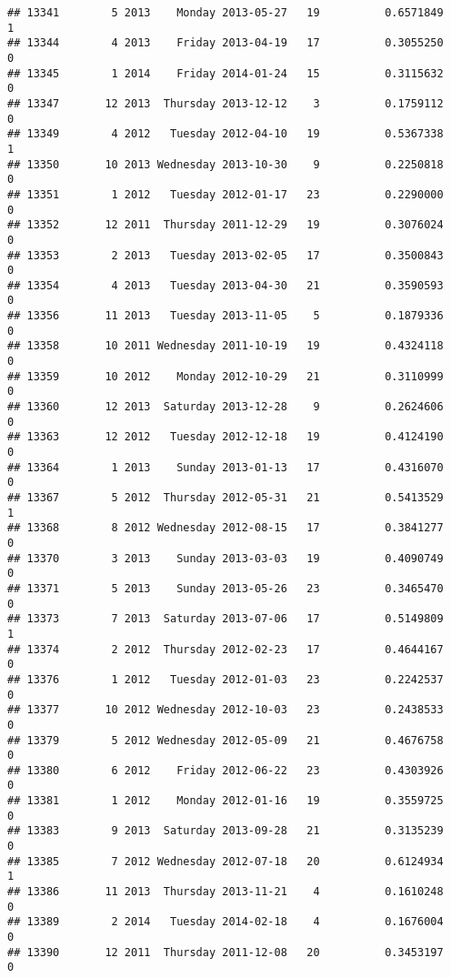 \documentclass[
]{article}
\begin{document}
\begin{verbatim}
## 13341        5 2013    Monday 2013-05-27   19          0.6571849             1
## 13344        4 2013    Friday 2013-04-19   17          0.3055250             0
## 13345        1 2014    Friday 2014-01-24   15          0.3115632             0
## 13347       12 2013  Thursday 2013-12-12    3          0.1759112             0
## 13349        4 2012   Tuesday 2012-04-10   19          0.5367338             1
## 13350       10 2013 Wednesday 2013-10-30    9          0.2250818             0
## 13351        1 2012   Tuesday 2012-01-17   23          0.2290000             0
## 13352       12 2011  Thursday 2011-12-29   19          0.3076024             0
## 13353        2 2013   Tuesday 2013-02-05   17          0.3500843             0
## 13354        4 2013   Tuesday 2013-04-30   21          0.3590593             0
## 13356       11 2013   Tuesday 2013-11-05    5          0.1879336             0
## 13358       10 2011 Wednesday 2011-10-19   19          0.4324118             0
## 13359       10 2012    Monday 2012-10-29   21          0.3110999             0
## 13360       12 2013  Saturday 2013-12-28    9          0.2624606             0
## 13363       12 2012   Tuesday 2012-12-18   19          0.4124190             0
## 13364        1 2013    Sunday 2013-01-13   17          0.4316070             0
## 13367        5 2012  Thursday 2012-05-31   21          0.5413529             1
## 13368        8 2012 Wednesday 2012-08-15   17          0.3841277             0
## 13370        3 2013    Sunday 2013-03-03   19          0.4090749             0
## 13371        5 2013    Sunday 2013-05-26   23          0.3465470             0
## 13373        7 2013  Saturday 2013-07-06   17          0.5149809             1
## 13374        2 2012  Thursday 2012-02-23   17          0.4644167             0
## 13376        1 2012   Tuesday 2012-01-03   23          0.2242537             0
## 13377       10 2012 Wednesday 2012-10-03   23          0.2438533             0
## 13379        5 2012 Wednesday 2012-05-09   21          0.4676758             0
## 13380        6 2012    Friday 2012-06-22   23          0.4303926             0
## 13381        1 2012    Monday 2012-01-16   19          0.3559725             0
## 13383        9 2013  Saturday 2013-09-28   21          0.3135239             0
## 13385        7 2012 Wednesday 2012-07-18   20          0.6124934             1
## 13386       11 2013  Thursday 2013-11-21    4          0.1610248             0
## 13389        2 2014   Tuesday 2014-02-18    4          0.1676004             0
## 13390       12 2011  Thursday 2011-12-08   20          0.3453197             0

\end{verbatim}
\end{document}
